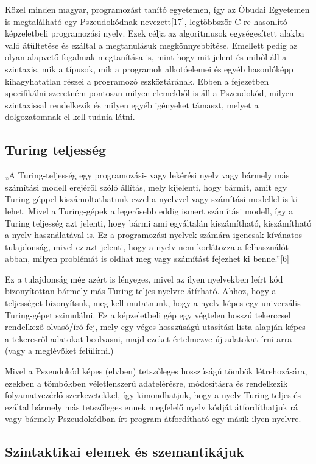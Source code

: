 Közel minden magyar, programozást tanító egyetemen, így az Óbudai Egyetemen is megtalálható egy Pszeudokódnak nevezett[17], legtöbbször C-re hasonlító képzeletbeli programozási nyelv. Ezek célja az algoritmusok egységesített alakba való átültetése és ezáltal a megtanulásuk megkönnyebbítése. Emellett pedig az olyan alapvető fogalmak megtanítása is, mint hogy mit jelent és miből áll a szintaxis, mik a típusok, mik a programok alkotóelemei és egyéb hasonlóképp kihagyhatatlan részei a programozó eszköztárának. Ebben a fejezetben specifikálni szeretném pontosan milyen elemekből is áll a Pszeudokód, milyen szintaxissal rendelkezik és milyen egyéb igényeket támaszt, melyet a dolgozatomnak el kell tudnia látni.

\subsection{Turing teljesség}
„A Turing-teljesség egy programozási- vagy lekérési nyelv vagy bármely más számítási modell erejéről szóló állítás, mely kijelenti, hogy bármit, amit egy Turing-géppel kiszámoltathatunk ezzel a nyelvvel vagy számítási modellel is ki lehet. Mivel a Turing-gépek a legerősebb eddig ismert számítási modell, így a Turing teljesség azt jelenti, hogy bármi ami egyáltalán kiszámítható, kiszámítható a nyelv használatával is. Ez a programozási nyelvek számára igencsak kívánatos tulajdonság, mivel ez azt jelenti, hogy a nyelv nem korlátozza a felhasználót abban, milyen problémát is oldhat meg vagy számítást fejezhet ki benne.”[6]

Ez a tulajdonság még azért is lényeges, mivel az ilyen nyelvekben leírt kód bizonyítottan bármely más Turing-teljes nyelvre átírható. Ahhoz, hogy a teljességet bizonyítsuk, meg kell mutatnunk, hogy a nyelv képes egy univerzális Turing-gépet szimulálni. Ez a képzeletbeli gép egy végtelen hosszú tekerccsel rendelkező olvasó/író fej, mely egy véges hosszúságú utasítási lista alapján képes a tekercsről adatokat beolvasni, majd ezeket értelmezve új adatokat írni arra (vagy a meglévőket felülírni.)

Mivel a Pszeudokód képes (elvben) tetszőleges hosszúságú tömbök létrehozására, ezekben a tömbökben véletlenszerű adatelérésre, módosításra és rendelkezik folyamatvezérlő szerkezetekkel, így kimondhatjuk, hogy a nyelv Turing-teljes és ezáltal bármely más tetszőleges ennek megfelelő nyelv kódját átfordíthatjuk rá vagy bármely Pszeudokódban írt program átfordítható egy másik ilyen nyelvre.

\subsection{Szintaktikai elemek és szemantikájuk}


